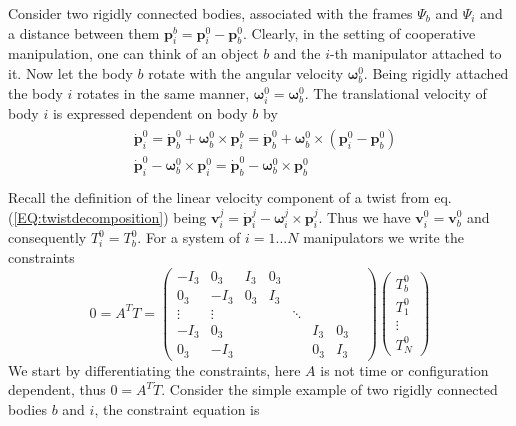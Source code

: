 \documentclass[a4paper,twoside, openright,12pt]{report}
\newcommand{\f}[1]{\boldsymbol{#1}}
\begin{document}
{Consider two rigidly connected bodies, associated with the frames $\Psi_b$ and $\Psi_i$ and a distance between them $\f{p}_i^b = \f{p}_i^0 - \f{p}_b^0$. Clearly, in the setting of cooperative manipulation, one can think of an object $b$ and the $i$-th manipulator attached to it. Now let the body $b$ rotate with the angular velocity $\boldsymbol{\omega}_b^0$. Being rigidly attached the body $i$ rotates in the same manner, $\boldsymbol{\omega}_i^0 = \boldsymbol{\omega}_b^0$. The translational velocity of body $i$ is expressed dependent on body $b$ by 
\begin{eqnarray}
\begin{aligned}
&\dot{\f{p}}_i^0 = \dot{\f{p}}_b^0 + \boldsymbol{\omega}_b^0 \times \f{p}_i^b = \dot{\f{p}}_b^0 + \boldsymbol{\omega}_b^0 \times (\f{p}_i^0-\f{p}_b^0) \\
&\dot{\f{p}}_i^0 - \boldsymbol{\omega}_b^0 \times \f{p}_i^0 = \dot{\f{p}}_b^0 - \boldsymbol{\omega}_b^0 \times \f{p}_b^0 \\
\end{aligned}
\end{eqnarray}
Recall the definition of the linear velocity component of a twist from eq. (\ref{EQ:twistdecomposition}) being $\f{v}_i^j= \dot{\f{p}}_i^j - \boldsymbol{\omega}_i^j \times \f{p}_i^j$. Thus we have $\f{v}_i^0 = \f{v}_b^0$ and consequently $T_i^0 = T_b^0$. For a system of $i=1...N$ manipulators we write the constraints
\begin{equation}
0 = A^T T = \begin{pmatrix}
-I_3 & 0_3 & I_3 & 0_3 & & & \\
0_3 & -I_3 & 0_3 & I_3 & & & \\
\vdots & \vdots & & & \ddots & & & \\
- I_3 & 0_3 & & & & I_3 & 0_3 \\
0_3 & -I_3 & & & & 0_3 & I_3 
\end{pmatrix}
\begin{pmatrix}
T_b^0 \\ T_1^0 \\ \vdots \\ T_N^0
\end{pmatrix}
\end{equation}
We start by differentiating the constraints, here $A$ is not time or configuration dependent, thus $0=A^T\dot{T}$. Consider the simple example of two rigidly connected bodies $b$ and $i$, the constraint equation is
\begin{eqnarray}
\begin{aligned}

\end{aligned}
\end{eqnarray}}
\end{document}
